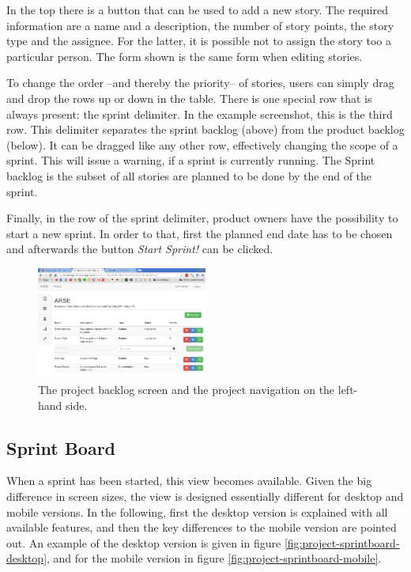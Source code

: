 \documentclass[
	accentcolor=tud1a %
]{tudreport}
\begin{document}
In the top there is a button that can be used to add a new story. The required information are a name and a description, the number of story points, the story type and the assignee. For the latter, it is possible not to assign the story too a particular person. The form shown is the same form when editing stories.

To change the order --and thereby the priority-- of stories, users can simply drag and drop the rows up or down in the table. There is one special row that is always present: the sprint delimiter. In the example screenshot, this is the third row. This delimiter separates the sprint backlog (above) from the product backlog (below). It can be dragged like any other row, effectively changing the scope of a sprint. This will issue a warning, if a sprint is currently running. The Sprint backlog is the subset of all stories are planned to be done by the end of the sprint.

Finally, in the row of the sprint delimiter, product owners have the possibility to start a new sprint. In order to that, first the planned end date has to be chosen and afterwards the button \emph{Start Sprint!} can be clicked.

\begin{figure}[ht]
	\centering
	\includegraphics[width=0.5\textwidth]{img/backlog}
	\caption{The project backlog screen and the project navigation on the left-hand side.}
	\label{fig:project-backlog}
\end{figure}

\subsection{Sprint Board}
\label{sec:sprint-board}


When a sprint has been started, this view becomes available. Given the big difference in screen sizes, the view is designed essentially different for desktop and mobile versions. In the following, first the desktop version is explained with all available features, and then the key differences to the mobile version are pointed out. An example of the desktop version is given in figure \ref{fig:project-sprintboard-desktop}, and for the mobile version in figure \ref{fig:project-sprintboard-mobile}.
\end{document}
